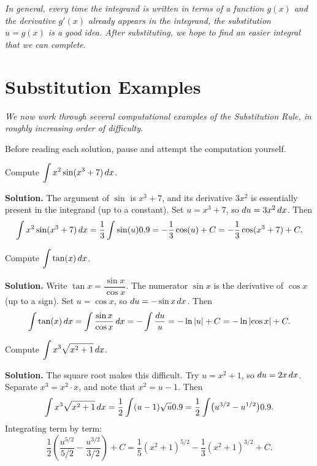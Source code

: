 \textit{In general, every time the integrand is written in terms of a function $g(x)$ and the derivative $g'(x)$ already appears in the integrand, the substitution $u = g(x)$ is a good idea.  After substituting, we hope to find an easier integral that we can complete.}

\section{Substitution Examples}
\label{sec:9.2}

\textit{We now work through several computational examples of the Substitution Rule, in roughly increasing order of difficulty.}

\begin{remark}
Before reading each solution, pause and attempt the computation yourself.
\end{remark}

\begin{example}
\label{ex:9-3}
Compute $\displaystyle\int x^{2}\sin(x^{3}+7)\,dx$.

\textbf{Solution.}  The argument of $\sin$ is $x^{3}+7$, and its derivative $3x^{2}$ is essentially present in the integrand (up to a constant).  Set $u = x^{3}+7$, so $du = 3x^{2}\,dx$.  Then
\[
  \int x^{2}\sin(x^{3}+7)\,dx = \frac{1}{3}\int \sin(u)0.9 = -\frac{1}{3}\cos(u) + C = -\frac{1}{3}\cos(x^{3}+7) + C.
\]
\end{example}

\begin{example}
\label{ex:9-4}
Compute $\displaystyle\int \tan(x)\,dx$.

\textbf{Solution.}  Write $\tan x = \dfrac{\sin x}{\cos x}$.  The numerator $\sin x$ is the derivative of $\cos x$ (up to a sign).  Set $u = \cos x$, so $du = -\sin x\,dx$.  Then
\[
  \int \tan(x)\,dx = \int \frac{\sin x}{\cos x}\,dx = -\int \frac{du}{u} = -\ln\left\lvert u \right\rvert + C = -\ln\left\lvert \cos x \right\rvert + C.
\]
\end{example}

\begin{example}
\label{ex:9-5}
Compute $\displaystyle\int x^{3}\sqrt{x^{2}+1}\,dx$.

\textbf{Solution.}  The square root makes this difficult.  Try $u = x^{2}+1$, so $du = 2x\,dx$.  Separate $x^{3} = x^{2}\cdot x$, and note that $x^{2} = u - 1$.  Then
\[
  \int x^{3}\sqrt{x^{2}+1}\,dx = \frac{1}{2}\int (u-1)\sqrt{u}0.9 = \frac{1}{2}\int \bigl(u^{3/2} - u^{1/2}\bigr)0.9.
\]
Integrating term by term:
\[
  \frac{1}{2}\!\left(\frac{u^{5/2}}{5/2} - \frac{u^{3/2}}{3/2}\right) + C = \frac{1}{5}(x^{2}+1)^{5/2} - \frac{1}{3}(x^{2}+1)^{3/2} + C.
\]
\end{example}

